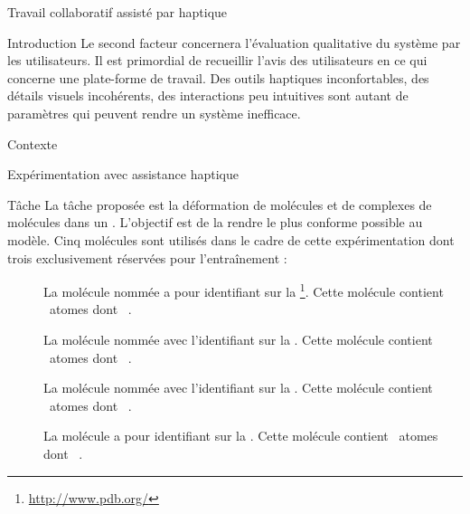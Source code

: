 \documentclass[myfrancais]{mythesis}
\begin{document}
\begin{mychapter}{Travail collaboratif assisté par haptique}
\begin{mysection}{Introduction}
			Le second facteur concernera l'évaluation qualitative du système par les utilisateurs.
			Il est primordial de recueillir l'avis des utilisateurs en ce qui concerne une plate-forme de travail.
			Des outils haptiques inconfortables, des détails visuels incohérents, des interactions peu intuitives sont autant de paramètres qui peuvent rendre un système inefficace.
		\end{mysection}
		\begin{mysection}{Contexte}
		\end{mysection}
		\begin{mysection}{Expérimentation avec assistance haptique}
			\begin{mysubsection}[sse-exp4-Tache]{Tâche}
				La tâche proposée est la déformation de molécules et de complexes de molécules dans un .
				L'objectif est de la rendre le plus conforme possible au modèle.
				Cinq molécules sont utilisés dans le cadre de cette expérimentation dont trois exclusivement réservées pour l'entraînement :
				\begin{description}
					\item[\myTRPCAGE]
						La molécule nommée \myTRPCAGE {} a pour identifiant \myPDB {} sur la \myPDBbase\footnote{\url{http://www.pdb.org/}}.
						Cette molécule contient ~atomes dont ~.
					\item[\myPrion]
						La molécule nommée \myPrion {} avec l'identifiant \myPDB {} sur la \myPDBbase\footnotemark[\value{footnote}].
						Cette molécule contient ~atomes dont ~.
					\item[\myUbiquitin]
						La molécule nommée \myUbiquitin {} avec l'identifiant \myPDB {} sur la \myPDBbase\footnotemark[\value{footnote}].
						Cette molécule contient ~atomes dont ~.
					\item[\myTRPZIPPER]
						La molécule \myTRPZIPPER {} a pour identifiant \myPDB {} sur la \myPDBbase\footnotemark[\value{footnote}].
						Cette molécule contient ~atomes dont ~.

\end{description}
\end{mysubsection}
\end{mysection}
\end{mychapter}
\end{document}
